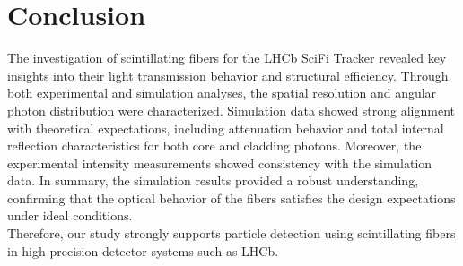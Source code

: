 \chapter{Conclusion}\label{ch:conclusion}
The investigation of scintillating fibers for the LHCb SciFi Tracker revealed key insights into their light transmission behavior and structural efficiency. Through both experimental and simulation analyses, the spatial resolution and angular photon distribution were characterized. Simulation data showed strong alignment with theoretical expectations, including attenuation behavior and total internal reflection characteristics for both core and cladding photons. Moreover, the experimental intensity measurements showed consistency with the simulation data. In summary, the simulation results provided a robust understanding, confirming that the optical behavior of the fibers satisfies the design expectations under ideal conditions.\\










Therefore, our study strongly supports particle detection using scintillating fibers in high-precision detector systems such as LHCb.



